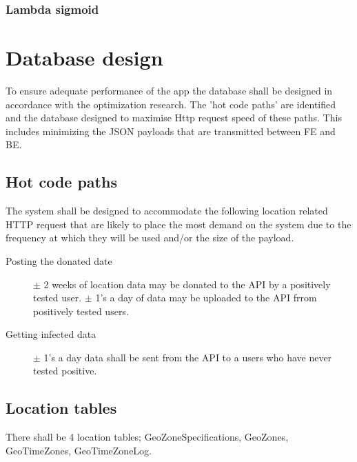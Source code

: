\documentclass[a4paper,open right,12pt]{report}
\begin{document}
\subsubsection{Lambda sigmoid}


\section{Database design}
To ensure adequate performance of the app the database shall be designed in accordance with the optimization research. The 'hot code paths' are identified and the database designed to maximise Http request speed of these paths. This includes minimizing the JSON payloads that are transmitted between FE and BE.

\subsection{Hot code paths}
The system shall be designed to accommodate the following location related HTTP request that are likely to place the most demand on the system due to the frequency at which they will be used and/or the size of the payload.
\begin{description}
    \item[Posting the donated date] $\pm$ 2 weeks of location data may be donated to the API by a positively tested user. $\pm$ 1's a day of data may be uploaded to the API frrom positively tested users.
    \item[Getting infected data] $\pm$ 1's a day data shall be sent from the API to a users who have never tested positive.
\end{description}

\subsection{Location tables}
There shall be 4 location tables; GeoZoneSpecifications, GeoZones, GeoTimeZones, GeoTimeZoneLog.\cite{LocationTables}
\end{document}
